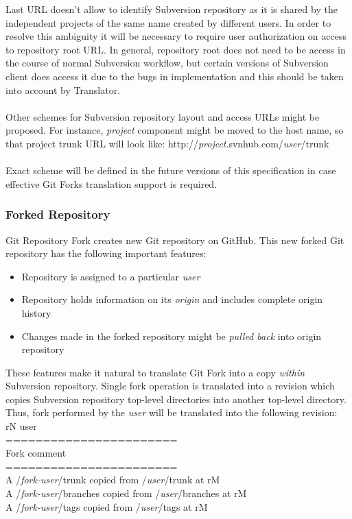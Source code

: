 Last URL doesn't allow to identify Subversion repository as it is shared by the independent projects of the same 
name created by different users. In order to resolve this ambiguity it will be necessary to require user authorization
on access to repository root URL. In general, repository root does not need to be access in the course of normal
Subversion workflow, but certain versions of Subversion client does access it due to the bugs in implementation and this 
should be taken into account by Translator.\\\\
Other schemes for Subversion repository layout and access URLs might be proposed. For instance, \emph{project} component
might be moved to the host name, so that project trunk URL will look like: http://\emph{project}.svnhub.com/\emph{user}/trunk
\\\\
Exact scheme will be defined in the future versions of this specification in case effective Git Forks translation support 
is required.
\subsubsection{Forked Repository}
Git Repository Fork creates new Git repository on GitHub. This new forked Git repository has the following 
important features:
\begin{itemize}
\item Repository is assigned to a particular \emph{user}
\item Repository holds information on its \emph{origin} and includes complete origin history
\item Changes made in the forked repository might be \emph{pulled back} into origin repository
\end{itemize}

These features make it natural to translate Git Fork into a copy \emph{within} Subversion repository. Single fork 
operation is translated into a revision which copies Subversion repository top-level directories into another top-level directory. 
Thus, fork performed by the \emph{user} will be translated into the following revision:\\

rN user\\ 
=======================\\
Fork comment             \\
=======================\\
A /\emph{fork-user}/trunk copied from /\emph{user}/trunk at rM\\
A /\emph{fork-user}/branches copied from /\emph{user}/branches at rM\\
A /\emph{fork-user}/tags copied from /\emph{user}/tags at rM\\

